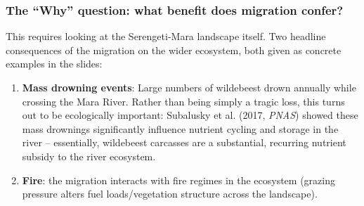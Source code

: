 \documentclass[11pt,a4paper]{article}
\begin{document}
\subsubsection*{The ``Why'' question: what benefit does migration confer?}
This requires looking at the Serengeti-Mara landscape itself. Two headline consequences of the migration on the wider ecosystem, both given as concrete examples in the slides:
\begin{enumerate}[leftmargin=1.5em]
\item \textbf{Mass drowning events}: Large numbers of wildebeest drown annually while crossing the Mara River. Rather than being simply a tragic loss, this turns out to be ecologically important: Subalusky et al. (2017, \emph{PNAS}) showed these mass drownings significantly influence nutrient cycling and storage in the river -- essentially, wildebeest carcasses are a substantial, recurring nutrient subsidy to the river ecosystem.
\item \textbf{Fire}: the migration interacts with fire regimes in the ecosystem (grazing pressure alters fuel loads/vegetation structure across the landscape).
\end{enumerate}
\end{document}
